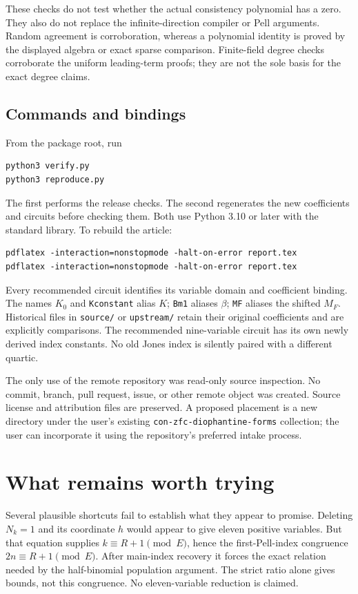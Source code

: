 These checks do not test whether the actual consistency polynomial has a
zero. They also do not replace the infinite-direction compiler or Pell
arguments. Random agreement is corroboration, whereas a polynomial
identity is proved by the displayed algebra or exact sparse comparison.
Finite-field degree checks corroborate the uniform leading-term proofs;
they are not the sole basis for the exact degree claims.

\subsection{Commands and bindings}

From the package root, run
\begin{verbatim}
python3 verify.py
python3 reproduce.py
\end{verbatim}
The first performs the release checks. The second regenerates the new
coefficients and circuits before checking them. Both use Python 3.10 or
later with the standard library. To rebuild the article:
\begin{verbatim}
pdflatex -interaction=nonstopmode -halt-on-error report.tex
pdflatex -interaction=nonstopmode -halt-on-error report.tex
\end{verbatim}

Every recommended circuit identifies its variable domain and coefficient
binding. The names $K_0$ and \texttt{Kconstant} alias $K$; \texttt{Bm1}
aliases $\beta$; \texttt{MF} aliases the shifted $M_F$.
Historical files in \texttt{source/} or \texttt{upstream/} retain their
original coefficients and are explicitly comparisons. The recommended
nine-variable circuit has its own newly derived index constants. No old
Jones index is silently paired with a different quartic.

The only use of the remote repository was read-only source inspection.
No commit, branch, pull request, issue, or other remote object was created.
Source license and attribution files are preserved. A proposed placement
is a new directory under the user's existing
\texttt{con-zfc-diophantine-forms} collection; the user can incorporate it
using the repository's preferred intake process.

\section{What remains worth trying}

Several plausible shortcuts fail to establish what they appear to promise.
Deleting $N_k=1$ and its coordinate $h$ would appear to give eleven positive
variables. But that equation supplies $k\equiv R+1\pmod E$, hence the
first-Pell-index congruence $2n\equiv R+1\pmod E$. After main-index
recovery it forces the exact relation needed by the half-binomial population
argument. The strict ratio alone gives bounds, not this congruence. No
eleven-variable reduction is claimed.

